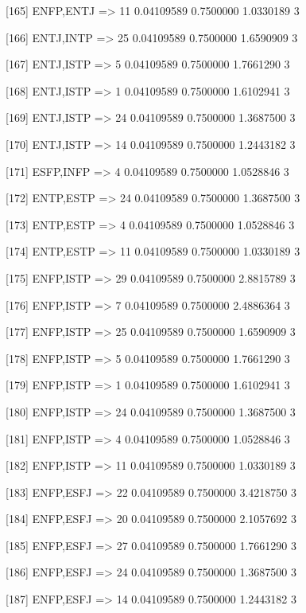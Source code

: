 [165] {ENFP,ENTJ}           => {11} 0.04109589 0.7500000  1.0330189  3   

[166] {ENTJ,INTP}           => {25} 0.04109589 0.7500000  1.6590909  3   

[167] {ENTJ,ISTP}           => {5}  0.04109589 0.7500000  1.7661290  3   

[168] {ENTJ,ISTP}           => {1}  0.04109589 0.7500000  1.6102941  3   

[169] {ENTJ,ISTP}           => {24} 0.04109589 0.7500000  1.3687500  3   

[170] {ENTJ,ISTP}           => {14} 0.04109589 0.7500000  1.2443182  3   

[171] {ESFP,INFP}           => {4}  0.04109589 0.7500000  1.0528846  3   

[172] {ENTP,ESTP}           => {24} 0.04109589 0.7500000  1.3687500  3   

[173] {ENTP,ESTP}           => {4}  0.04109589 0.7500000  1.0528846  3   

[174] {ENTP,ESTP}           => {11} 0.04109589 0.7500000  1.0330189  3   

[175] {ENFP,ISTP}           => {29} 0.04109589 0.7500000  2.8815789  3   

[176] {ENFP,ISTP}           => {7}  0.04109589 0.7500000  2.4886364  3   

[177] {ENFP,ISTP}           => {25} 0.04109589 0.7500000  1.6590909  3   

[178] {ENFP,ISTP}           => {5}  0.04109589 0.7500000  1.7661290  3   

[179] {ENFP,ISTP}           => {1}  0.04109589 0.7500000  1.6102941  3   

[180] {ENFP,ISTP}           => {24} 0.04109589 0.7500000  1.3687500  3   

[181] {ENFP,ISTP}           => {4}  0.04109589 0.7500000  1.0528846  3   

[182] {ENFP,ISTP}           => {11} 0.04109589 0.7500000  1.0330189  3   

[183] {ENFP,ESFJ}           => {22} 0.04109589 0.7500000  3.4218750  3   

[184] {ENFP,ESFJ}           => {20} 0.04109589 0.7500000  2.1057692  3   

[185] {ENFP,ESFJ}           => {27} 0.04109589 0.7500000  1.7661290  3   

[186] {ENFP,ESFJ}           => {24} 0.04109589 0.7500000  1.3687500  3   

[187] {ENFP,ESFJ}           => {14} 0.04109589 0.7500000  1.2443182  3   

